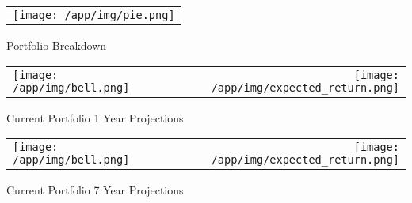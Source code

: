\documentclass{article}
\begin{document}
\begin{adjustwidth}{-.3in}{0in}%
\vspace*{-1cm}

\begin{center}
  \begin{tabular}{c}
    \texttt{[image: /app/img/pie.png]}
  \end{tabular}
  \end{center}

  \begin{center}
        Portfolio Breakdown
  \end{center}

\vspace{.7cm}


\begin{center}
  \begin{tabular}{lcr}
  \texttt{[image: /app/img/bell.png]}
    & \hspace{1cm }&\texttt{[image: /app/img/expected\_return.png]}
  \end{tabular}
  \end{center}

  \begin{center}
      Current Portfolio 1 Year Projections
  \end{center}

  \vspace{.7cm}


\begin{center}
  \begin{tabular}{lcr}
  \texttt{[image: /app/img/bell.png]}
    & \hspace{1cm }&\texttt{[image: /app/img/expected\_return.png]}
  \end{tabular}
  \end{center}

  \begin{center}
      Current Portfolio 7 Year Projections
  \end{center}

 \vspace{.6cm}

\end{adjustwidth}
\end{document}
